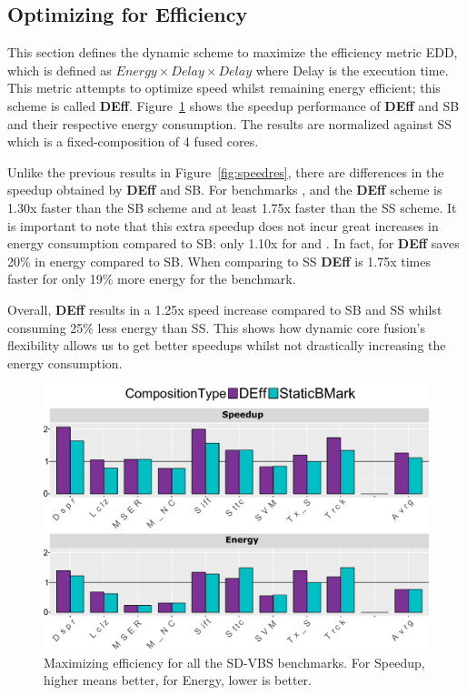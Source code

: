 \subsection{Optimizing for Efficiency}

This section defines the dynamic scheme to maximize the efficiency metric EDD, which is defined as $Energy \times Delay \times Delay$ where Delay is the execution time.
This metric attempts to optimize speed whilst remaining energy efficient; this scheme is called \textbf{DEff}.
Figure~\ref{fig:effres} shows the speedup performance of \textbf{DEff} and SB and their respective energy consumption.
The results are normalized against SS which is a fixed-composition of 4 fused cores.

Unlike the previous results in Figure~\ref{fig:speedres}, there are differences in the speedup obtained by \textbf{DEff} and SB.
For benchmarks ,  and  the \textbf{DEff} scheme is 1.30x faster than the SB scheme and at least 1.75x faster than the SS scheme.
It is important to note that this extra speedup does not incur great increases in energy consumption compared to SB: only 1.10x for  and .
In fact, for  \textbf{DEff} saves 20\% in energy compared to SB.
When comparing to SS \textbf{DEff} is 1.75x times faster for only 19\% more energy for the  benchmark.

Overall, \textbf{DEff} results in a 1.25x speed increase compared to SB and SS whilst consuming 25\% less energy than SS.
This shows how dynamic core fusion's flexibility allows us to get better speedups whilst not drastically increasing the energy consumption.

\begin{figure}
    \centering
    \includegraphics[width=1\textwidth]{cases-paper/graphics/results/edd_bars2.pdf}
    \caption{Maximizing efficiency for all the SD-VBS benchmarks. For Speedup, higher means better, for Energy, lower is better.}
    \label{fig:effres}
\end{figure}



